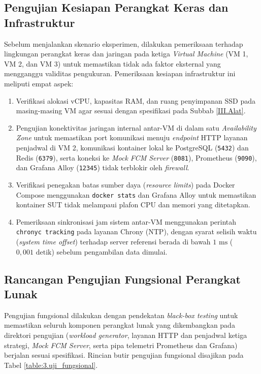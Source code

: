 \subsection{Pengujian Kesiapan Perangkat Keras dan Infrastruktur} \label{III.Uji_Infrastruktur}
Sebelum menjalankan skenario eksperimen, dilakukan pemeriksaan terhadap lingkungan perangkat keras dan jaringan pada ketiga \textit{Virtual Machine} (VM 1, VM 2, dan VM 3) untuk memastikan tidak ada faktor eksternal yang mengganggu validitas pengukuran. Pemeriksaan kesiapan infrastruktur ini meliputi empat aspek: \par
\begin{enumerate}[noitemsep]
	\item Verifikasi alokasi vCPU, kapasitas RAM, dan ruang penyimpanan SSD pada masing-masing VM agar sesuai dengan spesifikasi pada Subbab \ref{III.Alat}.
	\item Pengujian konektivitas jaringan internal antar-VM di dalam satu \textit{Availability Zone} untuk memastikan port komunikasi menuju \textit{endpoint} HTTP layanan penjadwal di VM 2, komunikasi kontainer lokal ke PostgreSQL (\texttt{5432}) dan Redis (\texttt{6379}), serta koneksi ke \textit{Mock FCM Server} (\texttt{8081}), Prometheus (\texttt{9090}), dan Grafana Alloy (\texttt{12345}) tidak terblokir oleh \textit{firewall}.
	\item Verifikasi penegakan batas sumber daya (\textit{resource limits}) pada Docker Compose menggunakan \texttt{docker stats} dan Grafana Alloy untuk memastikan kontainer SUT tidak melampaui plafon CPU dan memori yang ditetapkan.
	\item Pemeriksaan sinkronisasi jam sistem antar-VM menggunakan perintah \texttt{chronyc tracking} pada layanan Chrony (NTP), dengan syarat selisih waktu (\textit{system time offset}) terhadap server referensi berada di bawah $1\text{ ms}$ ($0{,}001\text{ detik}$) sebelum pengambilan data dimulai.
\end{enumerate}

\subsection{Rancangan Pengujian Fungsional Perangkat Lunak} \label{III.Uji_Fungsional}
Pengujian fungsional dilakukan dengan pendekatan \textit{black-box testing} untuk memastikan seluruh komponen perangkat lunak yang dikembangkan pada direktori pengujian (\textit{workload generator}, layanan HTTP dan penjadwal ketiga strategi, \textit{Mock FCM Server}, serta pipa telemetri Prometheus dan Grafana) berjalan sesuai spesifikasi. Rincian butir pengujian fungsional disajikan pada Tabel \ref{table:3.uji_fungsional}. \par

